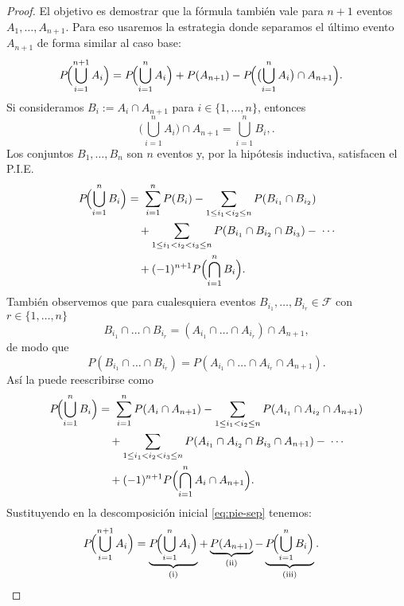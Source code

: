 \documentclass[../Main.tex]{subfiles}
\begin{document}
\begin{proof}
El objetivo es demostrar que la fórmula también vale para \(n+1\) eventos
\(A_1,\dots,A_{n+1}\). Para eso usaremos la estrategia donde separamos el último evento \(A_{n+1}\) de forma similar al caso base:
\begin{equation}
\begin{aligned}
   P\!\Bigl(\bigcup_{i=1}^{n+1}A_i\Bigr)
   &=
   P\!\Bigl(\bigcup_{i=1}^{n}A_i\Bigr)
   +P(A_{n+1})
   -P\!\Bigl(\bigl(\bigcup_{i=1}^{n}A_i\bigr)\cap A_{n+1}\Bigr). 
   \label{eq:pie-sep}
\end{aligned}
\end{equation}
Si consideramos \(B_i := A_i\cap A_{n+1}\) para \(i\in\{1,\dots, n\}\), entonces
\[
  \bigl(\bigcup_{i=1}^{n}A_i\bigr)\cap A_{n+1} = \bigcup_{i=1}^{n}B_i,.
\]
Los conjuntos \(B_1,\dots,B_n\) son \(n\) eventos y, por la hipótesis inductiva, satisfacen el P.I.E. 
\begin{equation}
\begin{aligned}
P\!\Bigl(\bigcup_{i=1}^{n} B_i\Bigr)
  &=\;
    \sum_{i=1}^{n} P(B_i)
    - \sum_{1\le i_1<i_2\le n} P(B_{i_1}\cap B_{i_2}) \\
  &\quad
    + \sum_{1\le i_1<i_2<i_3\le n} P(B_{i_1}\cap B_{i_2}\cap B_{i_3})
    -\; \cdots\\
  &\quad+ (-1)^{n+1} P\Bigl(\bigcap_{i=1}^{n} B_i\Bigr).
\end{aligned}
\label{PIEv2}
\end{equation}
También observemos que para cualesquiera eventos $B_{i_1},\dots,B_{i_r}\in\mathcal F$ con \(r\in\{1,\dots, n\}\)
\[
  B_{i_1}\cap\dots\cap B_{i_r}
  =
  (A_{i_1}\cap\dots\cap A_{i_r})\cap A_{n+1},
\]
de modo que
\[
   P(B_{i_1}\cap\dots\cap B_{i_r})
   =
   P(A_{i_1}\cap\dots\cap A_{i_r}\cap A_{n+1}).
\]
Así la  puede reescribirse como
\begin{equation}
\begin{aligned}
P\!\Bigl(\bigcup_{i=1}^{n} B_i\Bigr)
  &=\;
    \sum_{i=1}^{n} P(A_i\cap A_{n+1})
    - \sum_{1\le i_1<i_2\le n} P(A_{i_1}\cap A_{i_2}\cap A_{n+1}) \\
  &\quad
    + \sum_{1\le i_1<i_2<i_3\le n} P(A_{i_1}\cap A_{i_2}\cap B_{i_3}\cap A_{n+1})
    -\; \cdots\\
  &\quad+ (-1)^{n+1} P\Bigl(\bigcap_{i=1}^{n} A_i\cap A_{n+1}\Bigr).
\end{aligned}
\label{PIEv3}
\end{equation}
 Sustituyendo en la descomposición inicial \ref{eq:pie-sep} tenemos:
\begin{equation}
\begin{aligned}
   P\!\Bigl(\bigcup_{i=1}^{n+1}A_i\Bigr)
   &=
   \underbrace{P\!\Bigl(\bigcup_{i=1}^{n}A_i\Bigr)}_{\text{(i)}}
   +\underbrace{P(A_{n+1})}_{\text{(ii)}}
   -\underbrace{P\!\Bigl(\bigcup_{i=1}^{n}B_i\Bigr)}_{\text{(iii)}}.
\end{aligned}
\label{eq:aux}
\end{equation}


\end{proof}
\end{document}
